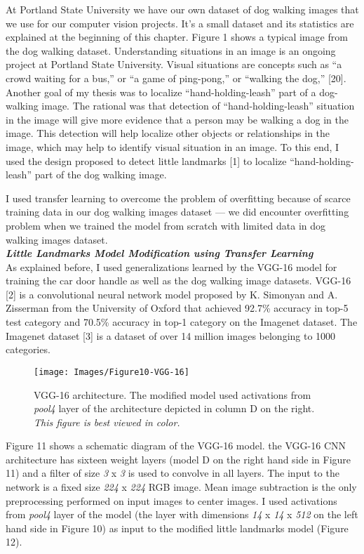 \documentclass [11pt,letterpaper ,twoside ,openany ]{report}
\begin{document}
    At Portland State University we have our own dataset of dog walking images that we use for our computer vision projects. It's a small dataset and its statistics are explained at the beginning of this chapter. Figure 1 shows a typical image from the dog walking dataset. Understanding situations in an image is an ongoing project at Portland State University. Visual situations are concepts such as ``a crowd waiting for a bus,'' or ``a game of ping-pong,'' or ``walking the dog,'' [20]. Another goal of my thesis was to localize ``hand-holding-leash'' part of a dog-walking image. The rational was that detection of ``hand-holding-leash'' situation in the image will give more evidence that a person may be walking a dog in the image. This detection will help localize other objects or relationships in the image, which may help to identify visual situation in an image. To this end, I used the design proposed to detect little landmarks [1] to localize ``hand-holding-leash'' part of the dog walking image. 

    I used transfer learning to overcome the problem of overfitting because of scarce training data in our dog walking images dataset --- we did encounter overfitting problem when we trained the model from scratch with limited data in dog walking images dataset. \\

    \noindent
    \textbf{\textit{Little Landmarks Model Modification using Transfer Learning}}\\                   
    As explained before, I used generalizations learned by the VGG-16 model for training the car door handle as well as the dog walking image datasets. VGG-16 [2] is a convolutional neural network model proposed by K. Simonyan and A. Zisserman from the University of Oxford that achieved 92.7\% accuracy in top-5 test category and 70.5\% accuracy in top-1 category on the Imagenet dataset. The Imagenet dataset [3] is a dataset of over 14 million images belonging to 1000 categories.   

    \begin{figure}[h]
      \centering
      \texttt{[image: Images/Figure10-VGG-16]}
      \caption{VGG-16 architecture. The modified model used activations from \textit{pool4} layer of the architecture depicted in column D on the right. \textit{This figure is best viewed in color.}}
      \label{fig:vgg}
    \end{figure}    

    Figure 11 shows a schematic diagram of the VGG-16 model. the VGG-16 CNN architecture has sixteen weight layers (model D on the right hand side in Figure 11) and a filter of size \textit{3} x \textit{3} is used to convolve in all layers. The input to the network is a fixed size \textit{224} x \textit{224} RGB image. Mean image subtraction is the only preprocessing performed on input images to center images. I used activations from \textit{pool4} layer of the model (the layer with dimensions \textit{14} x \textit{14} x \textit{512} on the left hand side in Figure 10) as input to the modified little landmarks model (Figure 12).     
\end{document}
